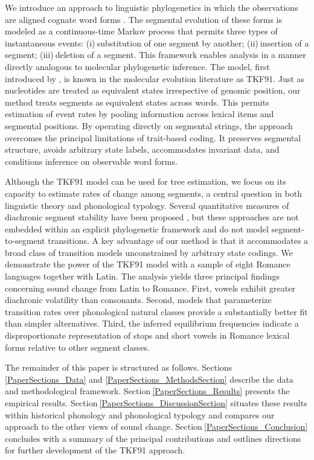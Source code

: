 \documentclass[numsec,webpdf,modern,large,namedate]{oup-authoring-template}
\begin{document}
We introduce an approach to linguistic phylogenetics in which the observations are aligned cognate word forms \citep{BouchardCote2013,Abner2024}. The segmental evolution of these forms is modeled as a continuous-time Markov process that permits three types of instantaneous events: (i)$~$substitution of one segment by another; (ii)$~$insertion of a segment; (iii)$~$deletion of a segment. This framework enables analysis in a manner directly analogous to molecular phylogenetic inference. The model, first introduced by \citet{Thorne1991}, is known in the molecular evolution literature as TKF91. Just as nucleotides are treated as equivalent states irrespective of genomic position, our method treats segments as equivalent states across words. This permits estimation of event rates by pooling information across lexical items and segmental positions. By operating directly on segmental strings, the approach overcomes the principal limitations of trait-based coding. It preserves segmental structure, avoids arbitrary state labels, accommodates invariant data, and conditions inference on observable word forms. 

Although the TKF91 model can be used for tree estimation, we focus on its capacity to estimate rates of change among segments, a central question in both linguistic theory and phonological typology. Several quantitative measures of diachronic segment stability have been proposed \citep{Wichmann2009,Moran2018,Moran2021}, but these approaches are not embedded within an explicit phylogenetic framework and do not model segment-to-segment transitions. A key advantage of our method is that it accommodates a broad class of transition models unconstrained by arbitrary state codings. We demonstrate the power of the TKF91 model with a sample of eight Romance languages together with Latin. The analysis yields three principal findings concerning sound change from Latin to Romance. First, vowels exhibit greater diachronic volatility than consonants. Second, models that parameterize transition rates over phonological natural classes provide a substantially better fit than simpler alternatives. Third, the inferred equilibrium frequencies indicate a disproportionate representation of stops and short vowels in Romance lexical forms relative to other segment classes. 

The remainder of this paper is structured as follows. Sections \ref{PaperSections_Data} and \ref{PaperSections_MethodsSection} describe the data and methodological framework. Section$~$\ref{PaperSections_Results} presents the empirical results. Section$~$\ref{PaperSections_DiscussionSection} situates these results within historical phonology and phonological typology and compares our approach to the other views of sound change. Section$~$\ref{PaperSections_Conclusion} concludes with a summary of the principal contributions and outlines directions for further development of the TKF91 approach. 
\end{document}
